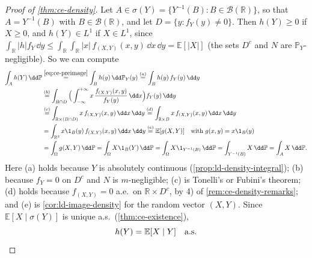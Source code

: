 \begin{proof}[Proof of \cref{thm:ce-density}]
Let $A\in\sigma(Y)=\{Y^{-1}(B):B\in\mathcal B(\mathbb R)\}$, so that $A=Y^{-1}(B)$ with
$B\in\mathcal B(\mathbb R)$, and let $D=\{y:f_Y(y)\ne0\}$. Then $h(Y)\ge0$ if $X\ge0$, and
$h(Y)\in L^1$ if $X\in L^1$, since
$\int_{\mathbb R}|h|f_Y\,\dd y\le\int_{\mathbb R}\int_{\mathbb R}|x|\,f_{(X,Y)}(x,y)\,\dd x\,\dd y=\mathbb E[|X|]$
(the sets $D^c$ and $N$ are $\mathbb P_Y$-negligible). So we can compute
\[
\begin{aligned}
  \int_Ah(Y)\,\dd\mathbb P&\overset{\eqref{eq:ce-preimage}}{=}\int_Bh(y)\,\dd\mathbb P_Y(y)
  \overset{(a)}{=}\int_Bh(y)\,f_Y(y)\,\dd y\\
  &\overset{(b)}{=}\int_{B\cap D}\Big(\int_{-\infty}^{+\infty}x\,\frac{f_{(X,Y)}(x,y)}{f_Y(y)}\,\dd x\Big)f_Y(y)\,\dd y\\
  &\overset{(c)}{=}\int_{\mathbb R\times(B\cap D)}x\,f_{(X,Y)}(x,y)\,\dd x\,\dd y
  \overset{(d)}{=}\int_{\mathbb R\times B}x\,f_{(X,Y)}(x,y)\,\dd x\,\dd y\\
  &=\int_{\mathbb R^2}x\1_B(y)\,f_{(X,Y)}(x,y)\,\dd x\,\dd y
  \overset{(e)}{=}\mathbb E[g(X,Y)]\quad\text{with }g(x,y)=x\1_B(y)\\
  &=\int_\Omega g(X,Y)\,\dd\mathbb P=\int_\Omega X\1_B(Y)\,\dd\mathbb P=\int_\Omega X\1_{Y^{-1}(B)}\,\dd\mathbb P
  =\int_{Y^{-1}(B)}X\,\dd\mathbb P=\int_AX\,\dd\mathbb P .
\end{aligned}
\]
Here (a) holds because $Y$ is absolutely continuous (\cref{prop:ld-density-integral}); (b) because
$f_Y=0$ on $D^c$ and $N$ is $m$-negligible; (c) is Tonelli's or Fubini's theorem; (d) holds because
$f_{(X,Y)}=0$ a.e.\ on $\mathbb R\times D^c$, by 4) of \cref{rem:ce-density-remarks}; and (e)
is \cref{cor:ld-image-density} for the random vector $(X,Y)$. Since $\mathbb E[X\mid\sigma(Y)]$
is unique a.s.\ (\cref{thm:ce-existence}),
\[
  h(Y)=\mathbb E[X\mid Y]\quad\text{a.s.}\qedhere
\]
\end{proof}

